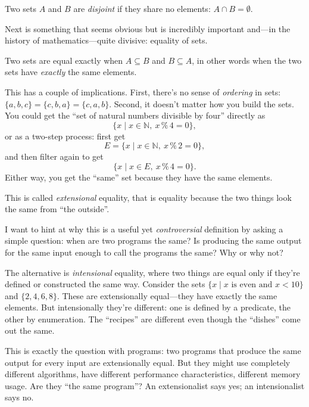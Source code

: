 \documentclass[11pt]{article}
\begin{document}
\begin{definition}[Disjoint]
Two sets $A$ and $B$ are \emph{disjoint} if they share no elements: $A \cap B = \emptyset$.
\end{definition}

Next is something that seems obvious but is incredibly important and---in the history of mathematics---quite divisive: equality of sets.

Two sets are equal exactly when $A \subseteq B$ and $B \subseteq A$, in other words when the two sets have \emph{exactly} the same elements.

This has a couple of implications. First, there's no sense of
\emph{ordering} in sets: $\{a,b,c\} = \{c,b,a\} = \{c,a,b\}$. Second,
it doesn't matter how you build the sets. You could get the ``set of
natural numbers divisible by four'' directly as
\[
  \{x \mid x \in \mathbb{N},\ x \mathbin{\%} 4 = 0\},
\]
or as a two-step process: first get
\[
  E = \{x \mid x \in \mathbb{N},\ x \mathbin{\%} 2 = 0\},
\]
and then filter again to get
\[
  \{x \mid x \in E,\ x \mathbin{\%} 4 = 0\}.
\]
Either way, you get the ``same'' set because they have the same elements.

This is called \emph{extensional} equality, that is equality because the two things look the same from ``the outside''.

I want to hint at why this is a useful yet \emph{controversial} definition by asking a simple question: when are two programs the same? Is producing the same output for the same input enough to call the programs the same? Why or why not?

The alternative is \emph{intensional} equality, where two things are equal only if they're defined or constructed the same way. Consider the sets $\{x \mid x \text{ is even and } x < 10\}$ and $\{2, 4, 6, 8\}$. These are extensionally equal---they have exactly the same elements. But intensionally they're different: one is defined by a predicate, the other by enumeration. The ``recipes'' are different even though the ``dishes'' come out the same.

This is exactly the question with programs: two programs that produce the same output for every input are extensionally equal. But they might use completely different algorithms, have different performance characteristics, different memory usage. Are they ``the same program''? An extensionalist says yes; an intensionalist says no.
\end{document}
